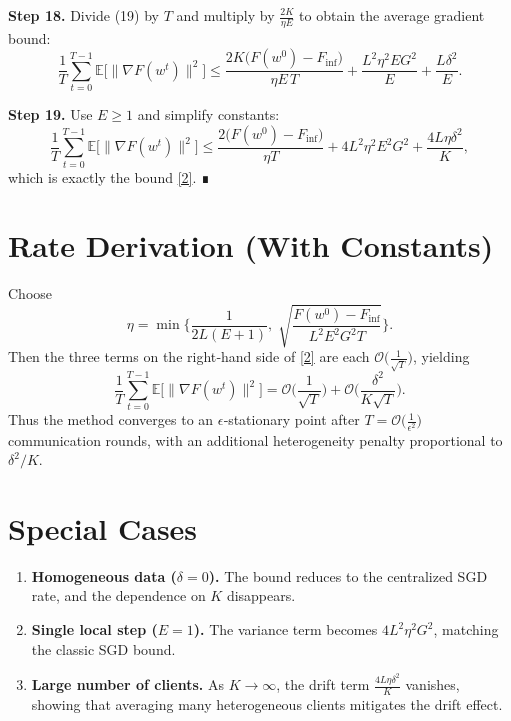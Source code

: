\documentclass{article}
\begin{document}
\noindent\textbf{Step 18.}  Divide (19) by $T$ and multiply by $\frac{2K}{\eta E}$
to obtain the average gradient bound:
\[
\frac{1}{T}\sum_{t=0}^{T-1}\mathbb{E}\!\big[\|\nabla F(w^{t})\|^{2}\big]
\le
\frac{2K\big(F(w^{0})-F_{\inf}\big)}{\eta E\,T}
+ \frac{L^{2}\eta^{2}E G^{2}}{E}
+ \frac{L\delta^{2}}{E}.
\tag{20}
\]

\noindent\textbf{Step 19.}  Use $E\ge1$ and simplify constants:
\[
\frac{1}{T}\sum_{t=0}^{T-1}\mathbb{E}\!\big[\|\nabla F(w^{t})\|^{2}\big]
\le
\frac{2\big(F(w^{0})-F_{\inf}\big)}{\eta T}
+4L^{2}\eta^{2}E^{2}G^{2}
+\frac{4L\eta\delta^{2}}{K},
\]
which is exactly the bound \eqref{2}.  ∎

\section*{Rate Derivation (With Constants)}
Choose
\[
\eta = \min\Big\{\frac{1}{2L(E+1)},\;\sqrt{\frac{F(w^{0})-F_{\inf}}{L^{2}E^{2}G^{2}T}}\Big\}.
\]
Then the three terms on the right‑hand side of \eqref{2} are each
$\mathcal{O}\!\big(\tfrac{1}{\sqrt{T}}\big)$, yielding
\[
\frac{1}{T}\sum_{t=0}^{T-1}\mathbb{E}\!\big[\|\nabla F(w^{t})\|^{2}\big]
= \mathcal{O}\!\Big(\frac{1}{\sqrt{T}}\Big)
+ \mathcal{O}\!\Big(\frac{\delta^{2}}{K\sqrt{T}}\Big).
\]
Thus the method converges to an $\epsilon$‑stationary point after
$T = \mathcal{O}\!\big(\frac{1}{\epsilon^{2}}\big)$ communication rounds,
with an additional heterogeneity penalty proportional to $\delta^{2}/K$.

\section*{Special Cases}
\begin{enumerate}
\item \textbf{Homogeneous data ($\delta=0$).}  The bound reduces to the
centralized SGD rate, and the dependence on $K$ disappears.
\item \textbf{Single local step ($E=1$).}  The variance term becomes
$4L^{2}\eta^{2}G^{2}$, matching the classic SGD bound.
\item \textbf{Large number of clients.}  As $K\to\infty$, the drift term
$\frac{4L\eta\delta^{2}}{K}$ vanishes, showing that averaging many heterogeneous
clients mitigates the drift effect.
\end{enumerate}
\end{document}
